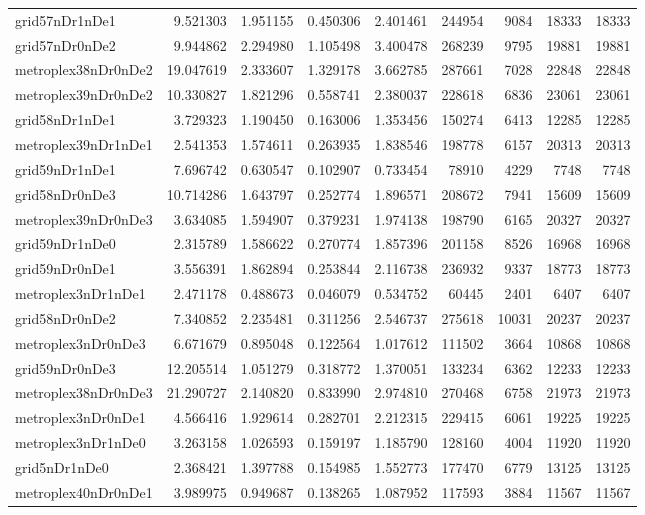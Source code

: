 \documentclass[../../../thesis.tex]{subfiles}
\begin{document}
\begin{longtable}{|l|r|r|r|r|r|r|r|r|}
grid57nDr1nDe1 & 9.521303 & 1.951155 & 0.450306 & 2.401461 & 244954 & 9084 & 18333 & 18333 \\
grid57nDr0nDe2 & 9.944862 & 2.294980 & 1.105498 & 3.400478 & 268239 & 9795 & 19881 & 19881 \\
metroplex38nDr0nDe2 & 19.047619 & 2.333607 & 1.329178 & 3.662785 & 287661 & 7028 & 22848 & 22848 \\
metroplex39nDr0nDe2 & 10.330827 & 1.821296 & 0.558741 & 2.380037 & 228618 & 6836 & 23061 & 23061 \\
grid58nDr1nDe1 & 3.729323 & 1.190450 & 0.163006 & 1.353456 & 150274 & 6413 & 12285 & 12285 \\
metroplex39nDr1nDe1 & 2.541353 & 1.574611 & 0.263935 & 1.838546 & 198778 & 6157 & 20313 & 20313 \\
grid59nDr1nDe1 & 7.696742 & 0.630547 & 0.102907 & 0.733454 & 78910 & 4229 & 7748 & 7748 \\
grid58nDr0nDe3 & 10.714286 & 1.643797 & 0.252774 & 1.896571 & 208672 & 7941 & 15609 & 15609 \\
metroplex39nDr0nDe3 & 3.634085 & 1.594907 & 0.379231 & 1.974138 & 198790 & 6165 & 20327 & 20327 \\
grid59nDr1nDe0 & 2.315789 & 1.586622 & 0.270774 & 1.857396 & 201158 & 8526 & 16968 & 16968 \\
grid59nDr0nDe1 & 3.556391 & 1.862894 & 0.253844 & 2.116738 & 236932 & 9337 & 18773 & 18773 \\
metroplex3nDr1nDe1 & 2.471178 & 0.488673 & 0.046079 & 0.534752 & 60445 & 2401 & 6407 & 6407 \\
grid58nDr0nDe2 & 7.340852 & 2.235481 & 0.311256 & 2.546737 & 275618 & 10031 & 20237 & 20237 \\
metroplex3nDr0nDe3 & 6.671679 & 0.895048 & 0.122564 & 1.017612 & 111502 & 3664 & 10868 & 10868 \\
grid59nDr0nDe3 & 12.205514 & 1.051279 & 0.318772 & 1.370051 & 133234 & 6362 & 12233 & 12233 \\
metroplex38nDr0nDe3 & 21.290727 & 2.140820 & 0.833990 & 2.974810 & 270468 & 6758 & 21973 & 21973 \\
metroplex3nDr0nDe1 & 4.566416 & 1.929614 & 0.282701 & 2.212315 & 229415 & 6061 & 19225 & 19225 \\
metroplex3nDr1nDe0 & 3.263158 & 1.026593 & 0.159197 & 1.185790 & 128160 & 4004 & 11920 & 11920 \\
grid5nDr1nDe0 & 2.368421 & 1.397788 & 0.154985 & 1.552773 & 177470 & 6779 & 13125 & 13125 \\
metroplex40nDr0nDe1 & 3.989975 & 0.949687 & 0.138265 & 1.087952 & 117593 & 3884 & 11567 & 11567 \\

\end{longtable}
\end{document}
